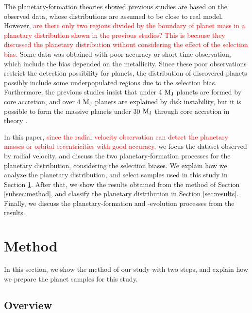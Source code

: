 \documentclass[twocolumn, dvipdfmx]{aastex62}
\def\red<#1>{\textcolor{red}{#1}}
\begin{document}
\begin{CJK*}{UTF8}{min}
The planetary-formation theories showed previous studies are based on the observed data, whose distributions are assumed to be close to real model. However, \red<are there only two regions divided by the boundary of planet mass in a planetary distribution shown in the previous studies? This is because they discussed the planetary distribution without considering the effect of the selection bias.> Some data was obtained with poor accuracy or short time observation, which include the bias depended on the metallicity. Since these poor observations restrict the detection possibility for planets, the distribution of discovered planets possibly include some underpopulated regions due to the selection bias. Furthermore, the previous studies insist that under 4 $\rm M_J$ planets are formed by core accretion, and over 4 $\rm M_J$ planets are explained by disk instability, but it is possible to form the massive planets under 30 $\rm M_J$ through core accretion in theory \citep[e.g.,][]{2009A&A...501.1161M, 2016ApJ...823...48T}.

In this paper, \red<since the radial velocity observation can detect the planetary masses or orbital eccentricities with good accuracy,> we focus the dataset observed by radial velocity, and discuss the two planetary-formation processes for the planetary distribution, considering the selection biases. We explain how we analyze the planetary distribution, and select samples used in this study in Section \ref{sec:method}. After that, we show the results obtained from the method of Section \ref{subsec:method}, and classify the planetary distribution in Section \ref{sec:results}. Finally, we discuss the planetary-formation and -evolution processes from the results.


\section{Method} \label{sec:method}

In this section, we show the method of our study with two steps, and explain how we prepare the planet samples for this study.


\subsection{Overview} \label{subsec:overview}


\end{CJK*}
\end{document}
